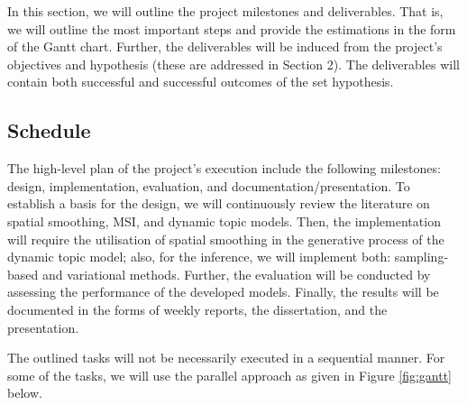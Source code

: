 \documentclass{mprop}
\begin{document}
\par In this section, we will outline the project milestones and deliverables. That is, we will outline the most important steps and provide the estimations in the form of the Gantt chart. Further, the deliverables will be induced from the project's objectives and hypothesis (these are addressed in Section 2). The deliverables will contain both successful and successful outcomes of the set hypothesis.

\subsection{Schedule}

\par The high-level plan of the project's execution include the following milestones: design, implementation, evaluation, and documentation/presentation. To establish a basis for the design, we will continuously review the literature on spatial smoothing, MSI, and dynamic topic models. Then, the implementation will require the utilisation of spatial smoothing in the generative process of the dynamic topic model; also, for the inference, we will implement both: sampling-based and variational methods. Further, the evaluation will be conducted by assessing the performance of the developed models. Finally, the results will be documented in the forms of weekly reports, the dissertation, and the presentation.

\par The outlined tasks will not be necessarily executed in a sequential manner. For some of the tasks, we will use the parallel approach as given in Figure \ref{fig:gantt} below.
\end{document}
